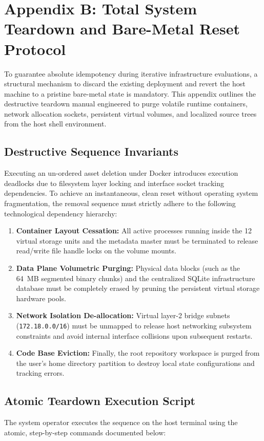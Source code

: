 \section{Appendix B: Total System Teardown and Bare-Metal Reset Protocol}
\label{sec:appendix_b}

To guarantee absolute idempotency during iterative infrastructure evaluations, a structural mechanism to discard the existing deployment and revert the host machine to a pristine bare-metal state is mandatory. This appendix outlines the destructive teardown manual engineered to purge volatile runtime containers, network allocation sockets, persistent virtual volumes, and localized source trees from the host shell environment.

\subsection{Destructive Sequence Invariants}
Executing an un-ordered asset deletion under Docker introduces execution deadlocks due to filesystem layer locking and interface socket tracking dependencies. To achieve an instantaneous, clean reset without operating system fragmentation, the removal sequence must strictly adhere to the following technological dependency hierarchy:
\begin{enumerate}
    \item \textbf{Container Layout Cessation:} All active processes running inside the 12 virtual storage units and the metadata master must be terminated to release read/write file handle locks on the volume mounts.
    \item \textbf{Data Plane Volumetric Purging:} Physical data blocks (such as the 64~MB segmented binary chunks) and the centralized SQLite infrastructure database must be completely erased by pruning the persistent virtual storage hardware pools.
    \item \textbf{Network Isolation De-allocation:} Virtual layer-2 bridge subnets (\texttt{172.18.0.0/16}) must be unmapped to release host networking subsystem constraints and avoid internal interface collisions upon subsequent restarts.
    \item \textbf{Code Base Eviction:} Finally, the root repository workspace is purged from the user's home directory partition to destroy local state configurations and tracking errors.
\end{enumerate}

\subsection{Atomic Teardown Execution Script}
The system operator executes the sequence on the host terminal using the atomic, step-by-step commands documented below:

